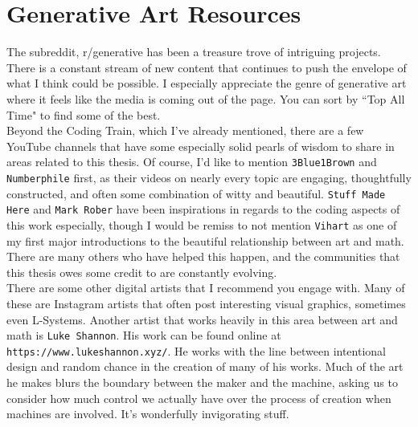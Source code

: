 \documentclass[12pt,twoside]{reedthesis}
\begin{document}
      \chapter{Generative Art Resources}
      \label{Resources}
      The subreddit, r/generative has been a treasure trove of intriguing projects. There is a constant stream of new content that continues to push the envelope of what I think could be possible. I especially appreciate the genre of generative art where it feels like the media is coming out of the page. You can sort by ``Top All Time" to find some of the best.\\
      
      Beyond the Coding Train, which I've already mentioned, there are a few YouTube channels that have some especially solid pearls of wisdom to share in areas related to this thesis. Of course, I'd like to mention {\tt 3Blue1Brown} and {\tt Numberphile} first, as their videos on nearly every topic are engaging, thoughtfully constructed, and often some combination of witty and beautiful. {\tt Stuff Made Here} and {\tt Mark Rober} have been inspirations in regards to the coding aspects of this work especially, though I would be remiss to not mention {\tt Vihart} as one of my first major introductions to the beautiful relationship between art and math. There are many others who have helped this happen, and the communities that this thesis owes some credit to are constantly evolving.\\
      
      There are some other digital artists that I recommend you engage with. Many of these are Instagram artists that often post interesting visual graphics, sometimes even L-Systems. Another artist that works heavily in this area between art and math is {\tt Luke Shannon}. His work can be found online at {\tt https://www.lukeshannon.xyz/}. He works with the line between intentional design and random chance in the creation of many of his works. Much of the art he makes blurs the boundary between the maker and the machine, asking us to consider how much control we actually have over the process of creation when machines are involved. It's wonderfully invigorating stuff.

\backmatter 


\nocite{*}
 
\end{document}
